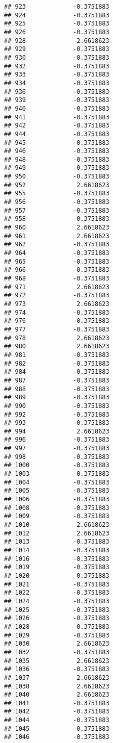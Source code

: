 \documentclass[
]{article}
\begin{document}
\begin{verbatim}
## 923             -0.3751883
## 924             -0.3751883
## 925             -0.3751883
## 926             -0.3751883
## 928              2.6618623
## 929             -0.3751883
## 930             -0.3751883
## 932             -0.3751883
## 933             -0.3751883
## 934             -0.3751883
## 936             -0.3751883
## 939             -0.3751883
## 940             -0.3751883
## 941             -0.3751883
## 942             -0.3751883
## 944             -0.3751883
## 945             -0.3751883
## 946             -0.3751883
## 948             -0.3751883
## 949             -0.3751883
## 950             -0.3751883
## 952              2.6618623
## 955             -0.3751883
## 956             -0.3751883
## 957             -0.3751883
## 958             -0.3751883
## 960              2.6618623
## 961              2.6618623
## 962             -0.3751883
## 964             -0.3751883
## 965             -0.3751883
## 966             -0.3751883
## 968             -0.3751883
## 971              2.6618623
## 972             -0.3751883
## 973              2.6618623
## 974             -0.3751883
## 976             -0.3751883
## 977             -0.3751883
## 978              2.6618623
## 980              2.6618623
## 981             -0.3751883
## 982             -0.3751883
## 984             -0.3751883
## 987             -0.3751883
## 988             -0.3751883
## 989             -0.3751883
## 990             -0.3751883
## 992             -0.3751883
## 993             -0.3751883
## 994              2.6618623
## 996             -0.3751883
## 997             -0.3751883
## 998             -0.3751883
## 1000            -0.3751883
## 1003            -0.3751883
## 1004            -0.3751883
## 1005            -0.3751883
## 1006            -0.3751883
## 1008            -0.3751883
## 1009            -0.3751883
## 1010             2.6618623
## 1012             2.6618623
## 1013            -0.3751883
## 1014            -0.3751883
## 1016            -0.3751883
## 1019            -0.3751883
## 1020            -0.3751883
## 1021            -0.3751883
## 1022            -0.3751883
## 1024            -0.3751883
## 1025            -0.3751883
## 1026            -0.3751883
## 1028            -0.3751883
## 1029            -0.3751883
## 1030             2.6618623
## 1032            -0.3751883
## 1035             2.6618623
## 1036            -0.3751883
## 1037             2.6618623
## 1038             2.6618623
## 1040             2.6618623
## 1041            -0.3751883
## 1042            -0.3751883
## 1044            -0.3751883
## 1045            -0.3751883
## 1046            -0.3751883

\end{verbatim}
\end{document}
